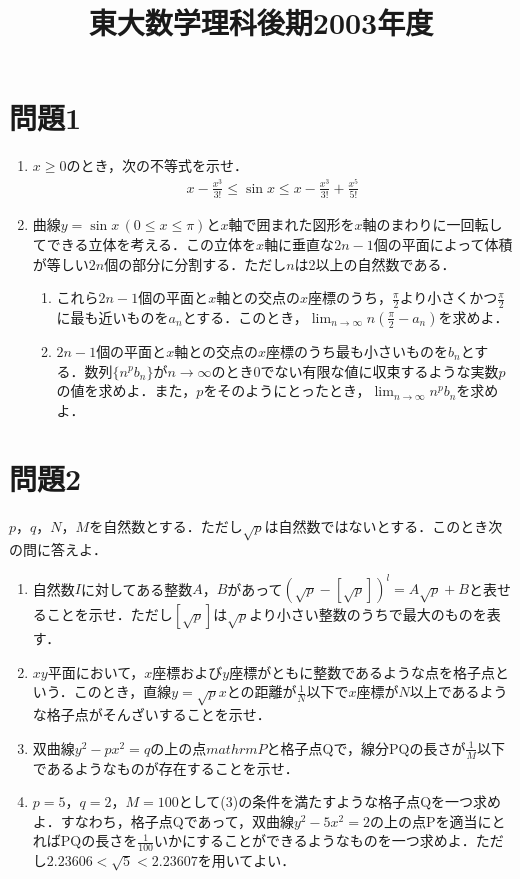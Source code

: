 \documentclass[unicode,12pt, A4j]{ltjsarticle}%
\title{東大数学理科後期2003年度}
\author{}
\date{}
\begin{document}
\maketitle

\section{問題1}
 \begin{enumerate}
  \item $x\ge 0$のとき，次の不等式を示せ．
        \begin{align*}
 	x-\frac{x^3}{3!}\le \sin x \le  x-\frac{x^3}{3!}+\frac{x^5}{5!}
        \end{align*}
  \item 曲線$y=\sin x\, (0\le x\le \pi)$と$x$軸で囲まれた図形を$x$軸のまわりに一回転してできる立体を考える．この立体を$x$軸に垂直な$2n-1$個の平面によって体積が等しい$2n$個の部分に分割する．ただし$n$は2以上の自然数である．
        \begin{enumerate}
 	\item これら$2n-1$個の平面と$x$軸との交点の$x$座標のうち，$\frac{\pi}{2}$より小さくかつ$\frac{\pi}{2}$に最も近いものを$a_n$とする．このとき，$\lim_{n\to\infty} n(\frac{\pi}{2}-a_n)$を求めよ．
 	\item $2n-1$個の平面と$x$軸との交点の$x$座標のうち最も小さいものを$b_n$とする．数列$\{n^pb_n\}$が$n\to\infty$のとき$0$でない有限な値に収束するような実数$p$の値を求めよ．また，$p$をそのようにとったとき，$\lim_{n\to\infty}n^pb_n$を求めよ．
        \end{enumerate}
 \end{enumerate}


\section{問題2}
$p$，$q$，$N$，$M$を自然数とする．ただし$\sqrt{p}$は自然数ではないとする．このとき次の問に答えよ．
\begin{enumerate}
 \item 自然数$I$に対してある整数$A$，$B$があって$(\sqrt{p}-[\sqrt{p}])^l=A\sqrt{p}+B$と表せることを示せ．ただし$[\sqrt{p}] $は$\sqrt{p}$より小さい整数のうちで最大のものを表す．
 \item $xy$平面において，$x$座標および$y$座標がともに整数であるような点を格子点という．このとき，直線$y=\sqrt{p}x$との距離が$\frac{1}{N}$以下で$x$座標が$N$以上であるような格子点がそんざいすることを示せ．
 \item 双曲線$y^2-px^2=q$の上の点$mathrm{P}$と格子点$\mathrm{Q}$で，線分$\mathrm{PQ}$の長さが$\frac{1}{M}$以下であるようなものが存在することを示せ．
 \item $p=5$，$q=2$，$M=100$として(3)の条件を満たすような格子点$\mathrm{Q}$を一つ求めよ．すなわち，格子点$\mathrm{Q}$であって，双曲線$y^2-5x^2=2$の上の点$\mathrm{P}$を適当にとれば$\mathrm{PQ}$の長さを$\frac{1}{100}$いかにすることができるようなものを一つ求めよ．ただし$2.23606<\sqrt{5}<2.23607$を用いてよい．
\end{enumerate}
\end{document}

